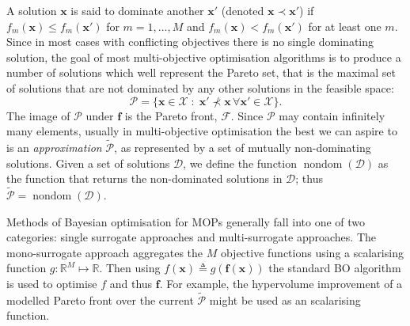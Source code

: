\documentclass[conference]{IEEEtran}
\newcommand{\evaluatedx}{\bX}
\newcommand{\paretofront}{\mathcal{F}}
\newcommand{\paretoset}{\mathcal{P}}
\newcommand{\attainmentfront}{\mathcal{A}}
\newcommand{\attainmentset}{\evaluatedx_{\mathcal{A}}}
\newcommand{\parameterspace}{\mathcal{X}}
\newcommand{\nobj}{M}
\newcommand{\defn}{\triangleq}
\DeclareMathOperator{\nondom}{nondom}
\newcommand\Papprox{\tilde{\mathcal{P}}}
\newcommand{\bx}{\mathbf{x}}
\newcommand{\bX}{\mathbf{X}}
\newcommand{\bff}{\mathbf{f}}
\newcommand{\data}{\mathcal{D}}
\newcommand{\mnote}[2][\textcolor{red}{\dagger}]{$#1$\marginpar{\color{red}\raggedright\tiny$#1$
    #2}}
\begin{document}
A solution $\bx$ is said to dominate another $\bx'$ (denoted $\bx \prec \bx'$) if $f_m(\bx) \le f_m(\bx')$ for $m = 1, \ldots, \nobj$ and $ f_m(\bx) < f_m(\bx')$ for at least one $m$. Since in most cases with conflicting objectives there is no single dominating solution, the goal of most multi-objective optimisation algorithms is to produce a number of solutions which well represent the Pareto set, that is the maximal set of solutions that are not dominated by any other solutions in the feasible space:
\begin{equation}\label{eqn: Pareto_set}
  \paretoset = \{\mathbf{x} \in \parameterspace \;:\;
  \bx' \not\prec \bx \,\forall \bx' \in \parameterspace \}.
\end{equation}
The image of $\paretoset$ under $\bff$ is the Pareto front, $\paretofront$. Since $\paretoset$ may contain infinitely many elements, usually  in multi-objective optimisation the best we can aspire to is an \emph{approximation} $\Papprox$, as represented by a set of mutually non-dominating solutions.   Given a set of solutions $\data$, we define the function $\nondom(\data)$ as the function that returns the non-dominated solutions in $\data$; thus $\Papprox = \nondom(\data)$.



Methods of Bayesian optimisation for MOPs generally fall into one of two
categories: single surrogate approaches and multi-surrogate approaches. The
mono-surrogate approach aggregates the $\nobj$ objective functions using a
scalarising function $g : \mathbb{R}^\nobj \mapsto \mathbb{R}$. Then using
$f(\bx) \defn g(\bff(\bx))$ the standard BO algorithm is used to optimise
$f$ and thus $\bff$. For example, the hypervolume improvement of a modelled
Pareto front over the current $\Papprox$ might be used as an
scalarising function. 
\end{document}
